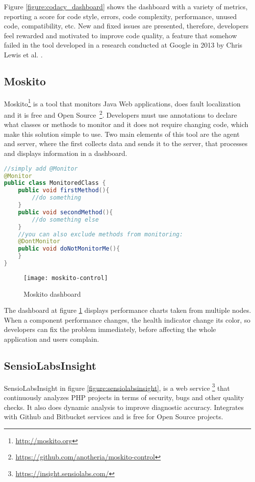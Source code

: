 Figure \ref{figure:codacy_dashboard} shows the dashboard with a variety of
metrics, reporting a score for code style, errors, code complexity, performance,
unused code, compatibility, etc. New and fixed issues are presented, therefore,
developers feel rewarded and motivated to improve code quality, a feature that
somehow failed in the tool developed in a research conducted at Google in 2013
by Chris Lewis et al. \cite{Chris2013}.

\subsection{Moskito}
Moskito\footnote{\url{http://moskito.org}} is a tool that monitors Java Web
applications, does fault localization and it is free and Open Source~\footnote{\url{https://github.com/anotheria/moskito-control}}.
Developers must use annotations to declare what classes or methods to monitor
and it does not require changing code, which make this solution simple to use.
Two main elements of this tool are the agent and server, where the first
collects data and sends it to the server, that processes and displays
information in a dashboard.

\begin{lstlisting}[language=java, caption=Usage example from Moskito documentation]
//simply add @Monitor
@Monitor
public class MonitoredClass {
    public void firstMethod(){
        //do something
    }
    public void secondMethod(){
        //do something else
    }
    //you can also exclude methods from monitoring:
    @DontMonitor
    public void doNotMonitorMe(){
    }
}
\end{lstlisting}

\begin{figure}[H]
    \begin{center}
        \texttt{[image: moskito-control]}
        \caption{Moskito dashboard}
        \label{figure:moskito_dashboard}
    \end{center}
\end{figure}

The dashboard at figure \ref{figure:moskito_dashboard} displays performance
charts taken from multiple nodes. When a component performance changes, the
health indicator change its color, so developers can fix the problem
immediately, before affecting the whole application and users complain.

\subsection{SensioLabsInsight}
SensioLabsInsight in figure \ref{figure:sensiolabsinsight}, is a web service
\footnote{\url{https://insight.sensiolabs.com/}} that continuously analyzes PHP
projects in terms of security, bugs and other quality checks. It also does
dynamic analysis to improve diagnostic accuracy. Integrates with Github and
Bitbucket services and is free for Open Source projects.

